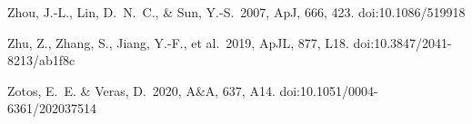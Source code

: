 \documentclass[useAMS,usenatbib]{mn2e}
\begin{document}
\begin{thebibliography}{99}
 Zhou, J.-L., Lin, D.~N.~C., \& Sun, Y.-S.\ 2007, ApJ, 666, 423. doi:10.1086/519918

 Zhu, Z., Zhang, S., Jiang, Y.-F., et al.\ 2019, ApJL, 877, L18. doi:10.3847/2041-8213/ab1f8c

 Zotos, E.~E. \& Veras, D.\ 2020, A\&A, 637, A14. doi:10.1051/0004-6361/202037514



\end{thebibliography}


\label{lastpage}
\end{document}

